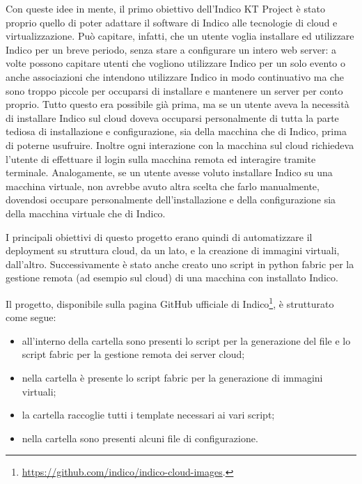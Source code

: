     Con queste idee in mente, il primo obiettivo dell'Indico KT Project è stato proprio quello di poter adattare il software di Indico alle tecnologie di cloud e virtualizzazione. Può capitare, infatti, che un utente voglia installare ed utilizzare Indico per un breve periodo, senza stare a configurare un intero web server: a volte possono capitare utenti che vogliono utilizzare Indico per un solo evento o anche associazioni che intendono utilizzare Indico in modo continuativo ma che sono troppo piccole per occuparsi di installare e mantenere un server per conto proprio. Tutto questo era possibile già prima, ma se un utente aveva la necessità di installare Indico sul cloud doveva occuparsi personalmente di tutta la parte tediosa di installazione e configurazione, sia della macchina che di Indico, prima di poterne usufruire. Inoltre ogni interazione con la macchina sul cloud richiedeva l'utente di effettuare il login sulla macchina remota ed interagire tramite terminale. Analogamente, se un utente avesse voluto installare Indico su una macchina virtuale, non avrebbe avuto altra scelta che farlo manualmente, dovendosi occupare personalmente dell'installazione e della configurazione sia della macchina virtuale che di Indico.
    
    I principali obiettivi di questo progetto erano quindi di automatizzare il deployment su struttura cloud, da un lato, e la creazione di immagini virtuali, dall'altro. Successivamente è stato anche creato uno script in python fabric per la gestione remota (ad esempio sul cloud) di una macchina con installato Indico.
    
    Il progetto, disponibile sulla pagina GitHub ufficiale di Indico\footnote{\url{https://github.com/indico/indico-cloud-images}.}, è strutturato come segue:
    
    \begin{itemize}
        \item all'interno della cartella  sono presenti lo script per la generazione del file  e lo script fabric per la gestione remota dei server cloud;
        \item nella cartella  è presente lo script fabric per la generazione di immagini virtuali;
        \item la cartella  raccoglie tutti i template necessari ai vari script;
        \item nella cartella  sono presenti alcuni file di configurazione.
    \end{itemize}
    
